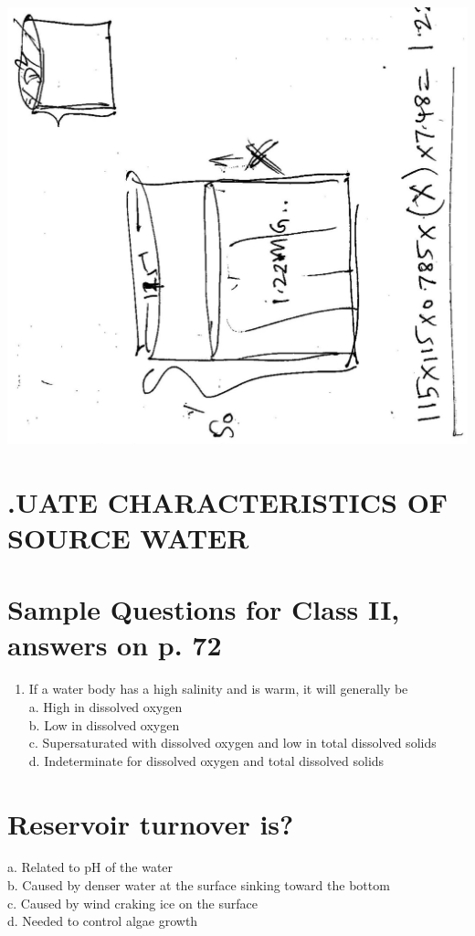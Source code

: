 \documentclass[10pt]{article}
\begin{document}
\begin{enumerate}
\includegraphics[max width=\textwidth]{2022_11_11_ca6a6c1a0324ee23e523g-32}

\end{enumerate}

\section{.UATE CHARACTERISTICS OF SOURCE WATER}
\section{Sample Questions for Class II, answers on p. 72}
\begin{enumerate}
  \item If a water body has a high salinity and is warm, it will generally be\\
a. High in dissolved oxygen\\
b. Low in dissolved oxygen\\
c. Supersaturated with dissolved oxygen and low in total dissolved solids\\
d. Indeterminate for dissolved oxygen and total dissolved solids
\end{enumerate}

\section{Reservoir turnover is?}
a. Related to $\mathrm{pH}$ of the water\\
b. Caused by denser water at the surface sinking toward the bottom\\
c. Caused by wind craking ice on the surface\\
d. Needed to control algae growth
\end{document}
